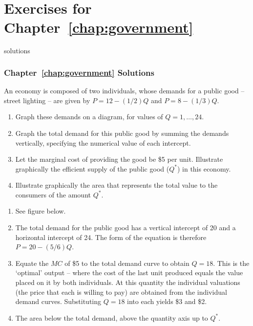 \newpage
\section*{Exercises for Chapter~\ref{chap:government}}

\begin{Filesave}{solutions}
\subsubsection*{Chapter~\ref{chap:government} Solutions}
\end{Filesave}

\begin{enumialphparenastyle}

\begin{econex}\label{ex:ch14ex1}
An economy is composed of two individuals, whose demands for a public good -- street lighting -- are given by $P=12-(1/2)Q$ and $P=8-(1/3)Q$.
\begin{enumerate}
\item	Graph these demands on a diagram, for values of $Q=1,\ldots,24$.
\item	Graph the total demand for this public good by summing the demands vertically, specifying the numerical value of each intercept.
\item	Let the marginal cost of providing the good be \$5 per unit. Illustrate graphically the efficient supply of the public good ($Q^{*}$) in this economy.
\item	Illustrate graphically the area that represents the total value to the consumers of the amount $Q^{*}$.
\end{enumerate}
\begin{econsolution}
\begin{enumerate}
\item	See figure below.
\item	The total demand for the public good has a vertical intercept of 20 and a horizontal intercept of 24. The form of the equation is therefore $P=20-(5/6)Q$.
\item	Equate the $MC$ of \$5 to the total demand curve to obtain $Q=18$. This is the `optimal' output -- where the cost of the last unit produced equals the value placed on it by both individuals. At this quantity the individual valuations (the price that each is willing to pay) are obtained from the individual demand curves. Substituting $Q=18$ into each yields \$3 and \$2.
\item	The area below the total demand, above the quantity axis up to $Q^{*}$.

\end{enumerate}
\end{econsolution}
\end{econex}
\end{enumialphparenastyle}
